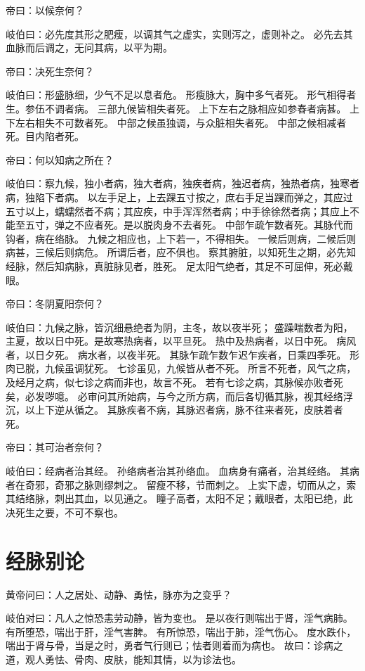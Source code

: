 \documentclass{article}%
\begin{document}
帝曰：以候奈何？

岐伯曰：必先度其形之肥瘦，以调其气之虚实，实则泻之，虚则补之。
必先去其血脉而后调之，无问其病，以平为期。

帝曰：决死生奈何？

岐伯曰：形盛脉细，少气不足以息者危。
形瘦脉大，胸中多气者死。
形气相得者生。参伍不调者病。
三部九候皆相失者死。
上下左右之脉相应如参舂者病甚。
上下左右相失不可数者死。
中部之候虽独调，与众脏相失者死。
中部之候相减者死。目内陷者死。

帝曰：何以知病之所在？

岐伯曰：察九候，独小者病，独大者病，独疾者病，独迟者病，独热者病，独寒者病，独陷下者病。
以左手足上，上去踝五寸按之，庶右手足当踝而弹之，其应过五寸以上，蠕蠕然者不病；其应疾，中手浑浑然者病；中手徐徐然者病；其应上不能至五寸，弹之不应者死。是以脱肉身不去者死。
中部乍疏乍数者死。其脉代而钩者，病在络脉。
九候之相应也，上下若一，不得相失。
一候后则病，二候后则病甚，三候后则病危。
所谓后者，应不俱也。
察其腑脏，以知死生之期，必先知经脉，然后知病脉，真脏脉见者，胜死。
足太阳气绝者，其足不可屈伸，死必戴眼。

帝曰：冬阴夏阳奈何？

岐伯曰：九候之脉，皆沉细悬绝者为阴，主冬，故以夜半死；
盛躁喘数者为阳，主夏，故以日中死。是故寒热病者，以平旦死。
热中及热病者，以日中死。
病风者，以日夕死。
病水者，以夜半死。
其脉乍疏乍数乍迟乍疾者，日乘四季死。
形肉已脱，九候虽调犹死。
七诊虽见，九候皆从者不死。
所言不死者，风气之病，及经月之病，似七诊之病而非也，故言不死。
若有七诊之病，其脉候亦败者死矣，必发哕噫。
必审问其所始病，与今之所方病，而后各切循其脉，视其经络浮沉，以上下逆从循之。
其脉疾者不病，其脉迟者病，脉不往来者死，皮肤着者死。

帝曰：其可治者奈何？

岐伯曰：经病者治其经。
孙络病者治其孙络血。
血病身有痛者，治其经络。
其病者在奇邪，奇邪之脉则缪刺之。
留瘦不移，节而刺之。
上实下虚，切而从之，索其结络脉，刺出其血，以见通之。
瞳子高者，太阳不足；戴眼者，太阳已绝，此决死生之要，不可不察也。


\section{经脉别论}
黄帝问曰：人之居处、动静、勇怯，脉亦为之变乎？

岐伯对曰：凡人之惊恐恚劳动静，皆为变也。
是以夜行则喘出于肾，淫气病肺。
有所堕恐，喘出于肝，淫气害脾。
有所惊恐，喘出于肺，淫气伤心。
度水跌仆，喘出于肾与骨，当是之时，勇者气行则已；怯者则着而为病也。
故曰：诊病之道，观人勇怯、骨肉、皮肤，能知其情，以为诊法也。
\end{document}
